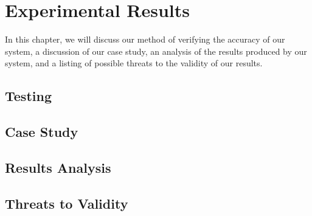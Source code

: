 %
%
%
\chapter{Experimental Results}\label{ch:results}

In this chapter, we will discuss our method of verifying the accuracy of our system,
a discussion of our case study, an analysis of the results produced by our system,
and a listing of possible threats to the validity of our results.

\section{Testing}\label{sec:test}

\section{Case Study}\label{sec:case}

\section{Results Analysis}\label{sec:data}

\section{Threats to Validity}\label{sec:valid}